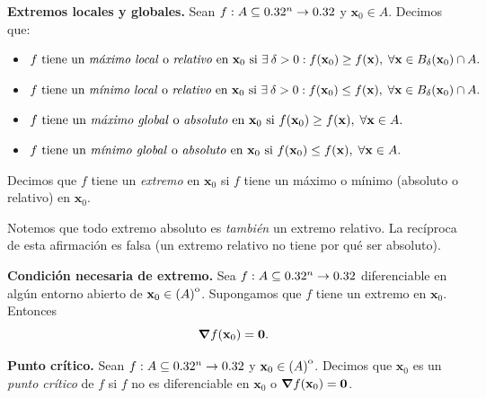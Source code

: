 \label{sec:extremos}




\begin{definition} \textbf{Extremos locales y globales.} \label{def:extremos} Sean $f: A  \subseteq  0.32^n \to 0.32$ y $\mathbf{x}_0 \in A$. Decimos que:
 \begin{itemize}
  \item $f \text{ tiene un \emph{m\'aximo local} o \emph{relativo} en } \mathbf{x}_0 \text{ si } \exists\: \delta > 0 : f(\mathbf{x}_0) \ge f(\mathbf{x}),\;\forall \mathbf{x} \in B_{\delta}(\mathbf{x}_0) \cap A.$ 
  \item $f \text{ tiene un \emph{m\'inimo local} o \emph{relativo} en } \mathbf{x}_0 \text{ si } \exists\: \delta > 0 : f(\mathbf{x}_0) \le f(\mathbf{x}),\;\forall \mathbf{x} \in B_{\delta}(\mathbf{x}_0) \cap A.$
  \item $f \text{ tiene un \emph{m\'aximo global} o \emph{absoluto} en } \mathbf{x}_0 \text{ si } f(\mathbf{x}_0) \ge f(\mathbf{x}),\;\forall \mathbf{x} \in A.$ 
  \item $f \text{ tiene un \emph{m\'inimo global} o \emph{absoluto} en } \mathbf{x}_0 \text{ si } f(\mathbf{x}_0) \le f(\mathbf{x}),\;\forall \mathbf{x} \in A.$
 \end{itemize}
 Decimos que $f$ tiene un \emph{extremo} en $\mathbf{x}_0$ si $f$ tiene un m\'aximo o m\'inimo (absoluto o relativo) en $\mathbf{x}_0$.
\end{definition}

\begin{obs}
 Notemos que todo extremo absoluto es \emph{tambi\'en} un extremo relativo. La rec\'iproca de esta afirmaci\'on es falsa (un extremo relativo no tiene por qu\'e ser absoluto).
\end{obs}

\begin{theorem}\textbf{Condici\'on necesaria de extremo.} \label{teo:grad_nulo} Sea $f: A  \subseteq  0.32^n \to 0.32$ diferenciable en alg\'un entorno abierto de $\mathbf{x}_0 \in {\kern0pt(A)}^{\mathrm{o}}$. Supongamos que $f$ tiene un extremo en $\mathbf{x}_0$. Entonces
 \[
  \grad f(\mathbf{x}_0) = \mathbf{0}.
 \]
\end{theorem}

\begin{definition} \textbf{Punto cr\'itico.} \label{def:pto_crit}
 Sean $f: A  \subseteq  0.32^n \to 0.32$ y $\mathbf{x}_0 \in {\kern0pt(A)}^{\mathrm{o}}$. Decimos que $\mathbf{x}_0$ es un \emph{punto cr\'itico} de $f$ si $f$ no es diferenciable en $\mathbf{x}_0$ o $\grad f{(\mathbf{x}_0)} = \mathbf{0}$.
\end{definition}

